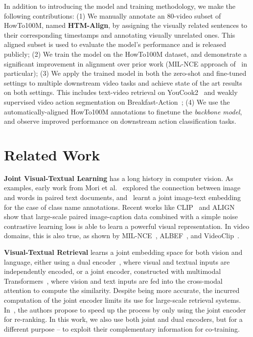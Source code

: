 In addition to introducing the model and training methodology, 
we make the following contributions:
(1) We manually annotate an 80-video subset of HowTo100M, named \textbf{HTM-Align},
by assigning the visually related sentences to their corresponding timestamps and annotating visually unrelated ones.  
This aligned subset is used to evaluate the model's performance 
and is released publicly;
(2) We train the model on the HowTo100M dataset, 
and demonstrate a significant improvement in alignment over prior work (MIL-NCE approach of~\cite{Miech20} in particular);
(3) We apply the trained model in both the zero-shot and fine-tuned settings to multiple downstream video tasks and achieve state of the art results on both settings. 
This includes text-video retrieval on YouCook2~\cite{Zhou18} and 
weakly supervised video action segmentation on Breakfast-Action~\cite{Kuehne12};
(4) We use the automatically-aligned HowTo100M annotations to finetune
the \emph{backbone model}, and observe improved performance 
on downstream action classification tasks.

\vspace{-2mm}
\section{Related Work}
\vspace{-1mm}
\noindent \textbf{Joint Visual-Textual Learning}
has a long history in computer vision.
As examples, early work from Mori et al.~\cite{Mori99}
explored the connection between image and words in paired text documents, 
and~\cite{Weston11} learnt a joint image-text embedding for the case of class name annotations.
Recent works like CLIP~\cite{Radford21} and ALIGN~\cite{Jia21} show that 
large-scale paired image-caption data combined with a simple noise contrastive learning loss 
is able to learn a powerful visual representation.
In video domains, this is also true, as shown by MIL-NCE~\cite{Miech20}, ALBEF~\cite{Li21ALBF}, 
and VideoClip~\cite{Xu2021videoclip}. \\[-8pt]

\par{\noindent \textbf{Visual-Textual Retrieval}}
learns a joint embedding space for both vision and language,
either using a dual encoder~\cite{Bain21,Gong14a,Gong14b,Klein15,Pan16,Plummer17,Dong19,Miech19,Radford21,Jia21}, 
where visual and textual inputs are independently encoded, 
or a joint encoder, 
constructed with multimodal Transformers~\cite{Tan19_lxmert,Lu19_Vilbert,Su19_Vlbert,Lu20_12in1,Chen20_Uniter,Li20_Unicoder,Zhou20}, 
where vision and text inputs are fed into the cross-modal attention to compute the similarity. 
Despite being more accurate, the incurred computation of the joint encoder limits its use for large-scale retrieval systems.
In~\cite{Miech21}, 
the authors propose to speed up the process by only using the joint encoder for re-ranking.
In this work, we also use both joint and dual encoders, 
but for a different purpose -- to exploit their complementary information for co-training.\\[-8pt]

